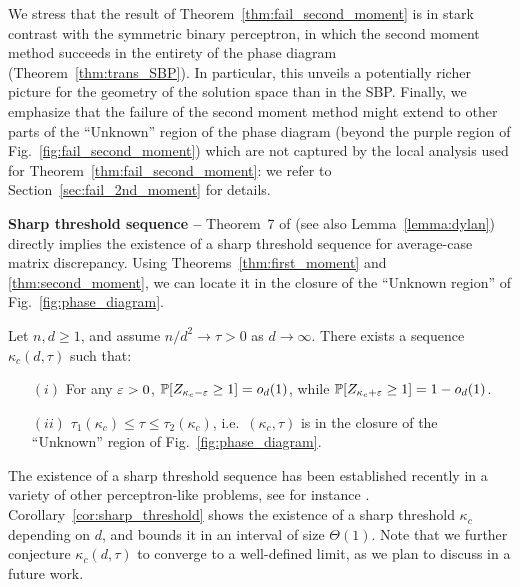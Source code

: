 \myskip
We stress that the result of Theorem~\ref{thm:fail_second_moment} is in stark contrast with the symmetric binary perceptron, in 
which the second moment method succeeds in the entirety of the phase diagram (Theorem~\ref{thm:trans_SBP}).
In particular, this unveils a potentially richer picture for the geometry of the solution space than in the SBP.
Finally, we emphasize that the failure of the second moment method might extend to other parts of the ``Unknown'' region of the phase diagram
(beyond the purple region of Fig.~\ref{fig:fail_second_moment}) 
which are not captured by the local analysis used for Theorem~\ref{thm:fail_second_moment}: we refer to Section~\ref{sec:fail_2nd_moment} for details.

\myskip 
\textbf{Sharp threshold sequence --}
Theorem~7 of \cite{altschuler2023zero} (see also Lemma~\ref{lemma:dylan})
directly implies the existence of a sharp threshold sequence for average-case matrix discrepancy. 
Using Theorems~\ref{thm:first_moment} and \ref{thm:second_moment}, we can locate it
in the closure of the ``Unknown region'' of Fig.~\ref{fig:phase_diagram}.
\begin{corollary}\label{cor:sharp_threshold}
    \noindent
    Let $n, d \geq 1$, and assume $n/d^2 \to \tau > 0$ as $d\to \infty$. There exists a sequence 
    $\kappa_c(d,\tau)$ such that: 
    \begin{itemize}
        \item[$(i)$] For any $\varepsilon > 0$, $\mathbb{P}[Z_{\kappa_c - \varepsilon} \geq 1] = o_d(1)$, while $\mathbb{P}[Z_{\kappa_c + \varepsilon} \geq 1] = 1 - o_d(1)$.
        \item[$(ii)$]  $\tau_1(\kappa_c) \leq \tau \leq \tau_2(\kappa_c)$, i.e.\ $(\kappa_c,\tau)$ is in the closure of the ``Unknown'' region of Fig.~\ref{fig:phase_diagram}.
    \end{itemize}
\end{corollary}
\noindent
The existence of a sharp threshold sequence has been established recently in a variety of other perceptron-like problems, see for instance \cite{talagrand1999self,talagrand2011mean,xu2021sharp,nakajima2023sharp,altschuler2023zero}.
Corollary~\ref{cor:sharp_threshold} shows the existence of a sharp threshold $\kappa_c$ depending on $d$, and bounds it in an interval of size $\Theta(1)$. Note that we further conjecture $\kappa_c(d,\tau)$ to converge to a well-defined limit, as we plan to discuss in a future work.


